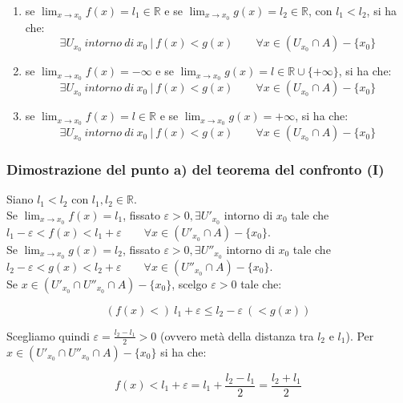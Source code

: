 \documentclass{article}
\begin{document}
\begin{enumerate}[label=\alph{enumi})]
    \item se $\lim_{x \to x_0} f(x) = l_1 \in \mathbb{R}$ e se $\lim_{x \to x_0} g(x) = l_2 \in \mathbb{R}$, con $l_1 < l_2$, si ha che: $$\exists U_{x_0} \ intorno \ di \ x_0 \ | \ f(x) < g(x) \qquad \forall x \in (U_{x_0} \cap A) - \{x_0\}$$
    \item se $\lim_{x \to x_0} f(x) = -\infty$ e se $\lim_{x \to x_0} g(x) = l \in \mathbb{R} \cup \{+\infty\}$, si ha che: $$\exists U_{x_0} \ intorno \ di \ x_0 \ | \ f(x) < g(x) \qquad \forall x \in (U_{x_0} \cap A) - \{x_0\}$$
    \item se $\lim_{x \to x_0} f(x) = l \in \mathbb{R}$ e se $\lim_{x \to x_0} g(x) = +\infty$, si ha che: $$\exists U_{x_0} \ intorno \ di \ x_0 \ | \ f(x) < g(x) \qquad \forall x \in (U_{x_0} \cap A) - \{x_0\}$$
\end{enumerate}

\subsubsection{Dimostrazione del punto a) del teorema del confronto (I)}
Siano $l_1 < l_2$ con $l_1, l_2 \in \mathbb{R}$. \\
Se $\lim_{x \to x_0} f(x) = l_1$, fissato $\varepsilon > 0, \exists U'_{x_0}$ intorno di $x_0$ tale che $l_1 - \varepsilon < f(x) < l_1 + \varepsilon \qquad \forall x \in (U'_{x_0} \cap A) - \{x_0\}$.\\
Se $\lim_{x \to x_0} g(x) = l_2$, fissato $\varepsilon > 0, \exists U''_{x_0}$ intorno di $x_0$ tale che $l_2 - \varepsilon < g(x) < l_2 + \varepsilon \qquad \forall x \in (U''_{x_0} \cap A) - \{x_0\}$.\\
Se $x \in (U'_{x_0} \cap U''_{x_0} \cap A) - \{x_0\}$, scelgo $\varepsilon > 0$ tale che: 

\begin{equation*}
    (f(x) < ) \ l_1 + \varepsilon \leq l_2 - \varepsilon \ (< g(x))
\end{equation*}

\noindent Scegliamo quindi $\varepsilon = \frac{l_2 - l_1}{2} > 0$ (ovvero metà della distanza tra $l_2$ e $l_1$). Per $x \in (U'_{x_0} \cap U''_{x_0} \cap A) - \{x_0\}$ si ha che:

\begin{equation*}
    f(x) < l_1 + \varepsilon = l_1 + \frac{l_2 - l_1}{2} = \frac{l_2 + l_1}{2}
\end{equation*}
\end{document}
